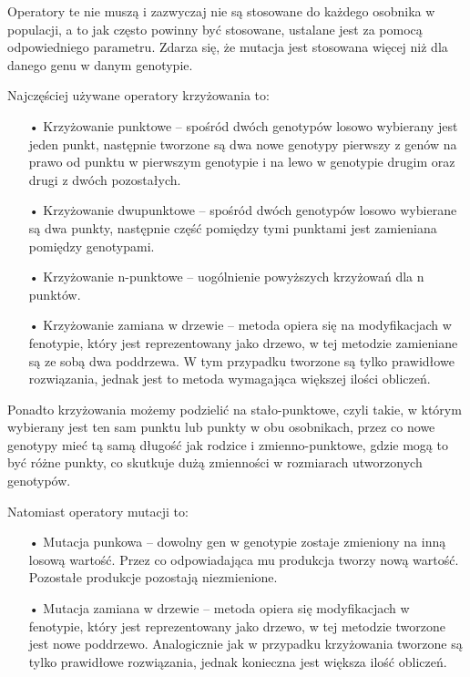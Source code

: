 Operatory te nie muszą i zazwyczaj nie są stosowane do każdego osobnika w populacji, a to jak często powinny być stosowane, ustalane jest za pomocą odpowiedniego parametru. Zdarza się, że mutacja jest stosowana więcej niż dla danego genu w danym genotypie.

Najczęściej używane operatory krzyżowania to:
\begin{itemize}
\item[•] Krzyżowanie punktowe -- spośród dwóch genotypów losowo wybierany jest jeden punkt, następnie tworzone są dwa nowe genotypy pierwszy z genów na prawo od punktu w pierwszym genotypie i na lewo w genotypie drugim oraz drugi z dwóch pozostałych.

\item[•] Krzyżowanie dwupunktowe -- spośród dwóch genotypów losowo wybierane są dwa punkty, następnie część pomiędzy tymi punktami jest zamieniana pomiędzy genotypami.

\item[•] Krzyżowanie n-punktowe -- uogólnienie powyższych krzyżowań dla n punktów.

\item[•] Krzyżowanie zamiana w drzewie -- metoda opiera się na modyfikacjach w fenotypie, który jest reprezentowany jako drzewo, w tej metodzie zamieniane są ze sobą dwa poddrzewa. W tym przypadku tworzone są tylko prawidłowe rozwiązania, jednak jest to metoda wymagająca większej ilości obliczeń.  
\end{itemize}
Ponadto krzyżowania możemy podzielić na stało-punktowe, czyli takie, w którym wybierany jest ten sam punktu lub punkty w obu osobnikach, przez co nowe genotypy mieć tą samą długość jak rodzice i zmienno-punktowe, gdzie mogą to być różne punkty, co skutkuje dużą zmienności w rozmiarach utworzonych genotypów. 

Natomiast operatory mutacji to:
\begin{itemize}
\item[•] Mutacja punkowa -- dowolny gen w genotypie zostaje zmieniony na inną losową wartość. Przez co odpowiadająca mu produkcja tworzy nową wartość. Pozostałe produkcje pozostają niezmienione.

\item[•] Mutacja zamiana w drzewie -- metoda opiera się modyfikacjach w fenotypie, który jest reprezentowany jako drzewo, w tej metodzie tworzone jest nowe poddrzewo. Analogicznie jak w przypadku krzyżowania tworzone są tylko prawidłowe rozwiązania, jednak konieczna jest większa ilość obliczeń. 
\end{itemize}

